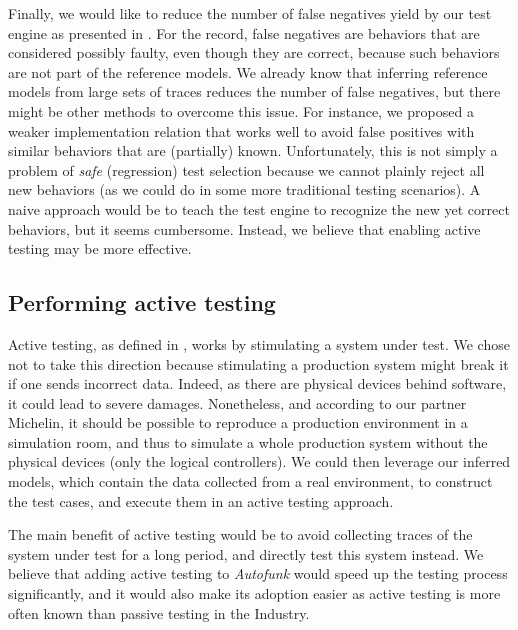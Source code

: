 Finally, we would like to reduce the number of false negatives
yield by our test engine as presented in
. For the
record, false negatives are behaviors that are considered
possibly faulty, even though they are correct, because such
behaviors are not part of the reference models. We already know
that inferring reference models from large sets of traces reduces
the number of false negatives, but there might be other methods
to overcome this issue. For instance, we proposed a weaker
implementation relation that works well to avoid false positives
with similar behaviors that are (partially) known. Unfortunately,
this is not simply a problem of \emph{safe} (regression) test
selection \cite{orso2004scaling} because we cannot plainly reject
all new behaviors (as we could do in some more traditional
testing scenarios). A naive approach would be to teach the test
engine to recognize the new yet correct behaviors, but it seems
cumbersome. Instead, we believe that enabling active testing may
be more effective.


\subsection{Performing active testing}
\label{sec:conclusion:testing:active}

Active testing, as defined in
,
works by stimulating a system under test. We chose not to take
this direction because stimulating a production system might
break it if one sends incorrect data. Indeed, as there are
physical devices behind software, it could lead to severe
damages.  Nonetheless, and according to our partner Michelin, it
should be possible to reproduce a production environment in a
simulation room, and thus to simulate a whole production system
without the physical devices (only the logical controllers). We
could then leverage our inferred models, which contain the data
collected from a real environment, to construct the test cases,
and execute them in an active testing approach.

The main benefit of active testing would be to avoid collecting
traces of the system under test for a long period, and directly
test this system instead. We believe that adding active testing
to \textit{Autofunk} would speed up the testing process
significantly, and it would also make its adoption easier as
active testing is more often known than passive testing in the
Industry.

